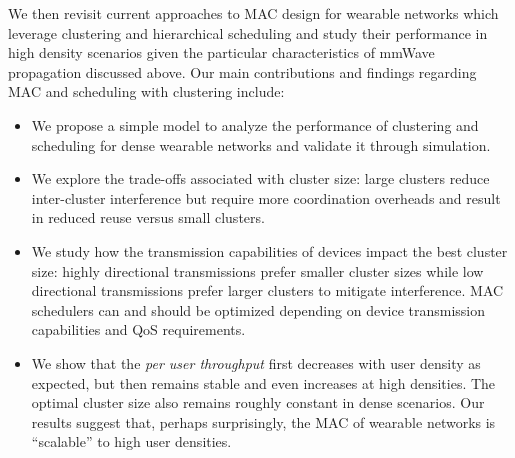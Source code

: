 \documentclass[10pt, conference, letterpaper]{IEEEtran}
\begin{document}
We then revisit current approaches to MAC design for wearable networks which leverage clustering and hierarchical scheduling and study their performance in high density scenarios given the particular characteristics of mmWave propagation discussed above. 
Our main contributions and findings regarding MAC and scheduling with clustering include:
\begin{itemize}
	\item We propose a simple model to analyze the performance of clustering and scheduling for dense wearable networks and validate it through simulation.
	\item We explore the trade-offs associated with cluster size: large clusters reduce inter-cluster interference but require more coordination overheads and result in reduced reuse versus small clusters.
	\item We study how the transmission capabilities of devices impact the best cluster size: highly directional transmissions prefer smaller cluster sizes while low directional transmissions prefer larger clusters to mitigate interference. MAC schedulers can and should be optimized depending on device transmission capabilities and QoS requirements. 
	\item We show that the \emph{per user throughput} first decreases with user density as expected, but then remains stable and even increases at high densities. The optimal cluster size also remains roughly constant in dense scenarios. Our results suggest that, perhaps surprisingly, the MAC of wearable networks is ``scalable'' to high user densities. %
\end{itemize}

\end{document}
